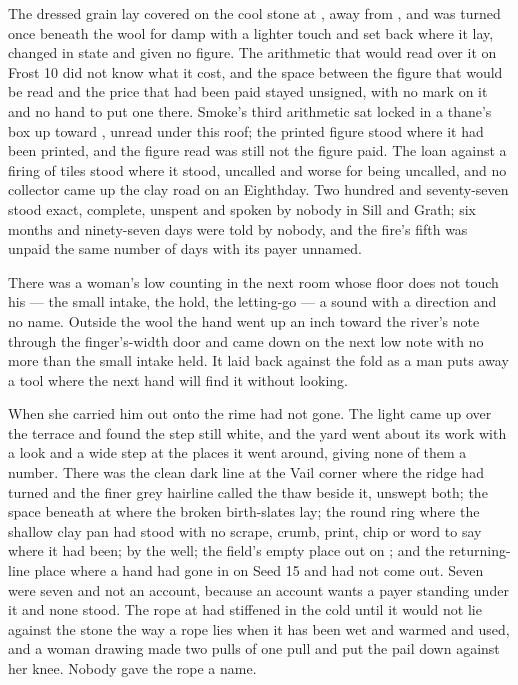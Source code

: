 The dressed grain lay covered on the cool stone at , away from , and was turned once beneath the wool for damp with a lighter touch and set back where it lay, changed in state and given no figure. The arithmetic that would read over it on Frost 10 did not know what it cost, and the space between the figure that would be read and the price that had been paid stayed unsigned, with no mark on it and no hand to put one there. Smoke's third arithmetic sat locked in a thane's box up  toward , unread under this roof; the printed figure stood where it had been printed, and the figure read was still not the figure paid. The loan against a firing of tiles stood where it stood, uncalled and worse for being uncalled, and no collector came up the clay road on an Eighthday. Two hundred and seventy-seven stood exact, complete, unspent and spoken by nobody in Sill and Grath; six months and ninety-seven days were told by nobody, and the fire's fifth was unpaid the same number of days with its payer unnamed.

\scenebreak

There was a woman's low counting in the next room whose floor does not touch his --- the small intake, the hold, the letting-go --- a sound with a direction and no name. Outside the wool the hand went up an inch toward the river's note through the finger's-width door and came down on the next low note with no more than the small intake held. It laid back against the fold as a man puts away a tool where the next hand will find it without looking.

When she carried him out onto  the rime had not gone. The light came up over the terrace and found the step still white, and the yard went about its work with a look and a wide step at the places it went around, giving none of them a number. There was the clean dark line at the Vail corner where the  ridge had turned and the finer grey hairline called the thaw beside it, unswept both; the space beneath  at  where the broken birth-slates lay; the round ring where the shallow clay pan had stood with no scrape, crumb, print, chip or word to say where it had been;  by the well; the field's empty place out on ; and the returning-line place where a hand had gone in on Seed 15 and had not come out. Seven were seven and not an account, because an account wants a payer standing under it and none stood. The rope at  had stiffened in the cold until it would not lie against the stone the way a rope lies when it has been wet and warmed and used, and a woman drawing made two pulls of one pull and put the pail down against her knee. Nobody gave the rope a name.

